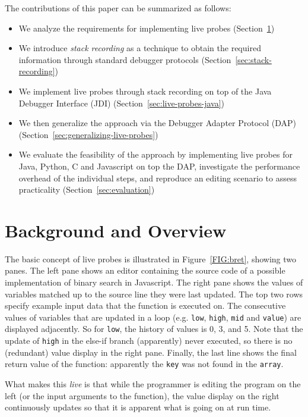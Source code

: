 \documentclass[english,submission]{programming}
\begin{document}
The contributions of this paper can be summarized as follows:
\begin{itemize}
  \item We analyze the requirements for implementing live probes (Section~\ref{sec:problem-overview})
  \item We introduce \textit{stack recording} as a technique to obtain the required information through standard debugger protocols (Section~\ref{sec:stack-recording})
  \item We implement live probes through stack recording on top of the Java Debugger Interface (JDI) (Section~\ref{sec:live-probes-java})
  \item We then generalize the approach via the Debugger Adapter Protocol (DAP) (Section~\ref{sec:generalizing-live-probes})
   \item We evaluate the feasibility of the approach by implementing live probes for Java, Python, C and Javascript on top the DAP, investigate the performance overhead of the individual steps, and reproduce an editing scenario to assess practicality (Section~\ref{sec:evaluation})
\end{itemize}

\section{Background and Overview}
\label{sec:problem-overview}


The basic concept of live probes is illustrated in Figure~\ref{FIG:bret}, showing two panes. 
The left pane shows an editor containing the source code of a possible implementation of binary search in Javascript. 
The right pane shows the values of variables matched up to the source line they were last updated.
The top two rows specify example input data that the function is executed on. The consecutive values of variables that are updated in a loop (e.g. \lstinline{low}, \lstinline{high}, \lstinline{mid} and \lstinline{value}) are displayed adjacently. So for \lstinline{low}, the history of values is 0, 3, and 5. Note that the update of \lstinline{high} in the else-if branch (apparently) never executed, so there is no (redundant) value display in the right pane. Finally, the last line shows the final return value of the function: apparently the \lstinline{key} was not found in the \lstinline[language=c]{array}. 

What makes this \textit{live} is that while the programmer is editing the program on the left (or the input arguments to the function), the value display on the right continuously updates so that it is apparent what is going on at run time. 
\end{document}
